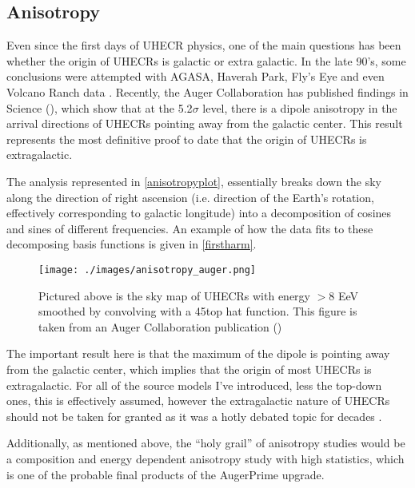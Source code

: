 \subsection{Anisotropy}
Even since the first days of UHECR physics, one of the main questions has been whether the origin of UHECRs is galactic or extra galactic. In the late 90's, some conclusions were attempted with AGASA, Haverah Park, Fly's Eye and even Volcano Ranch data \cite{tds}. Recently, the Auger Collaboration has published findings in Science (\cite{anisotropy}), which show that at the 5.2$\sigma$ level, there is a dipole anisotropy in the arrival directions of UHECRs pointing away from the galactic center. This result represents the most definitive proof to date that the origin of UHECRs is extragalactic. 

The analysis represented in \autoref{anisotropyplot}, essentially breaks down the sky along the direction of right ascension (i.e. direction of the Earth's rotation, effectively corresponding to galactic longitude) into a decomposition of cosines and sines of different frequencies. An example of how the data fits to these decomposing basis functions is given in \autoref{firstharm}.
\begin{figure}[h!]
\begin{center}
\texttt{[image: ./images/anisotropy\_auger.png]}
\caption[Anistropy Sky Map]{Pictured above is the sky map of UHECRs with energy $>8$ EeV smoothed by convolving with a 45\degree top hat function. This figure is taken from an Auger Collaboration publication (\cite{anisotropy})}
\label{anisotropyplot}
\end{center}
\end{figure}


The important result here is that the maximum of the dipole is pointing away from the galactic center, which implies that the origin of most UHECRs is extragalactic. For all of the source models I've introduced, less the top-down ones, this is effectively assumed, however the extragalactic nature of UHECRs should not be taken for granted as it was a hotly debated topic for decades \cite{hillas,tds}.

Additionally, as mentioned above, the ``holy grail'' of anisotropy studies would be a composition and energy dependent anisotropy study with high statistics, which is one of the probable final products of the AugerPrime upgrade. 
\newpage
{}
